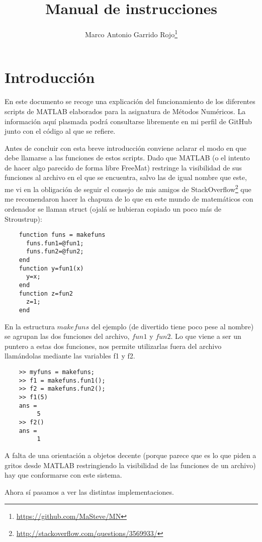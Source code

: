 \documentclass[spanish, a4paper, 12pt] {article}
\begin{document}
\title{Manual de instrucciones}
\author{Marco Antonio Garrido Rojo\thanks{\url{https://github.com/MaSteve/MN}}}
\date{}
\maketitle
\section*{Introducción}
En este documento se recoge una explicación del funcionamiento de los diferentes scripts de MATLAB elaborados para la asignatura de Métodos Numéricos. La información aquí plasmada podrá consultarse libremente en mi perfil de GitHub junto con el código al que se refiere.\\ \par
Antes de concluir con esta breve introducción conviene aclarar el modo en que debe llamarse a las funciones de estos scripts. Dado que MATLAB (o el intento de hacer algo parecido de forma libre FreeMat) restringe la visibilidad de sus funciones al archivo en el que se encuentra, salvo las de igual nombre que este, me vi en la obligación de seguir el consejo de mis amigos de StackOverflow\footnote{\url{http://stackoverflow.com/questions/3569933/}} que me recomendaron hacer la chapuza de lo que en este mundo de matemáticos con ordenador se llaman struct (ojalá se hubieran copiado un poco más de Stroustrup):
\begin{verbatim}
    function funs = makefuns
      funs.fun1=@fun1;
      funs.fun2=@fun2;
    end
    function y=fun1(x)
      y=x;
    end
    function z=fun2
      z=1;
    end
\end{verbatim}
\par
En la estructura $makefuns$ del ejemplo (de divertido tiene poco pese al nombre) se agrupan las dos funciones del archivo, $fun1$ y $fun2$. Lo que viene a ser un puntero a estas dos funciones, nos permite utilizarlas fuera del archivo llamándolas mediante las variables f1 y f2.
\begin{verbatim}
    >> myfuns = makefuns;
    >> f1 = makefuns.fun1();
    >> f2 = makefuns.fun2();
    >> f1(5)
    ans =
         5
    >> f2()
    ans =
         1
\end{verbatim}
\par
A falta de una orientación a objetos decente (porque parece que es lo que piden a gritos desde MATLAB restringiendo la visibilidad de las funciones de un archivo) hay que conformarse con este sistema.\\ \par
Ahora sí pasamos a ver las distintas implementaciones.
\end{document}
